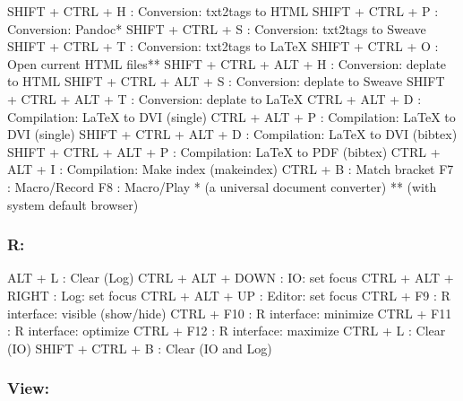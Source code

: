 \vspace{-0.5cm}
\begin{Rtables}[caption={[Tools menu keyboard shortcuts]
    ToolsMenu keyboard shortcuts},
  label=menu:tools]
  SHIFT + CTRL + H        : Conversion: txt2tags to HTML
  SHIFT + CTRL + P        : Conversion: Pandoc*
  SHIFT + CTRL + S        : Conversion: txt2tags to Sweave
  SHIFT + CTRL + T        : Conversion: txt2tags to LaTeX
  SHIFT + CTRL + O        : Open current HTML files**
  SHIFT + CTRL + ALT + H  : Conversion: deplate to HTML
  SHIFT + CTRL + ALT + S  : Conversion: deplate to Sweave
  SHIFT + CTRL + ALT + T  : Conversion: deplate to LaTeX
  CTRL  + ALT  + D        : Compilation: LaTeX to DVI (single)
  CTRL  + ALT  + P        : Compilation: LaTeX to DVI (single)
  SHIFT + CTRL + ALT + D  : Compilation: LaTeX to DVI (bibtex)
  SHIFT + CTRL + ALT + P  : Compilation: LaTeX to PDF (bibtex)
  CTRL  + ALT  + I        : Compilation: Make index (makeindex)
  CTRL  + B               : Match bracket
  F7                      : Macro/Record
  F8                      : Macro/Play
  *  (a universal document converter)
  ** (with system default browser)
\end{Rtables}


\subsubsection{R:}

\vspace{-0.5cm}
\begin{Rtables}[caption={[R menu keyboard shortcuts]
    R menu keyboard shortcuts},
  label=menu:r]
  ALT   + L               : Clear (Log)
  CTRL  + ALT  + DOWN     : IO: set focus
  CTRL  + ALT  + RIGHT    : Log: set focus
  CTRL  + ALT  + UP       : Editor: set focus
  CTRL  + F9              : R interface: visible (show/hide)
  CTRL  + F10             : R interface: minimize
  CTRL  + F11             : R interface: optimize
  CTRL  + F12             : R interface: maximize
  CTRL  + L               : Clear (IO)
  SHIFT + CTRL + B        : Clear (IO and Log)
\end{Rtables}


\subsubsection{View:}

